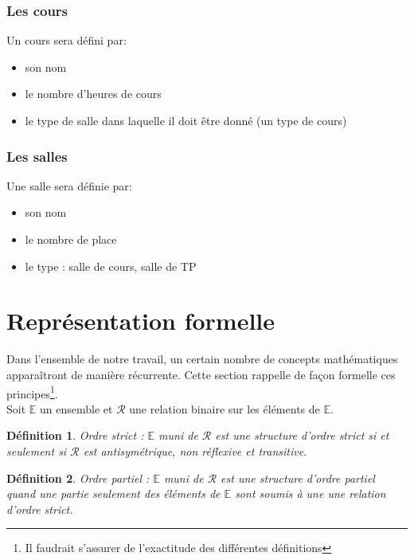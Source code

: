 \documentclass[12pt,a4paper,french]{article}
\begin{document}
\subsubsection{Les cours}
Un cours sera défini par:
\begin{itemize}
\item son nom
\item le nombre d'heures de cours
\item le type de salle dans laquelle il doit être donné (un type de cours)
\end{itemize}

\subsubsection{Les salles}
Une salle sera définie par:
\begin{itemize}
\item son nom
\item le nombre de place
\item le type : salle de cours, salle de TP
\end{itemize}

\newpage
\section{Représentation formelle}

\newtheorem{definition}{Définition}
\newtheorem{lemme}{Lemme}
\newtheorem{proposition}{Proposition}
\newtheorem{theoreme}{Thorme}
\newtheorem{eg}{Exemple}
\newcommand{\ds}{\displaystyle}



Dans l'ensemble de notre travail, un certain nombre de concepts mathématiques apparaîtront de manière récurrente. Cette section rappelle de façon formelle ces principes\footnote{Il faudrait s'assurer de l'exactitude des différentes définitions}.\\

Soit $\mathbb{E}$ un ensemble et  $\mathcal{R}$ une relation binaire sur les éléments de $\mathbb{E}$. 

\begin{definition}{\emph{Ordre strict : }}
$\mathbb{E}$ muni de $\mathcal{R}$ est une structure d'ordre strict si et seulement si $\mathcal{R}$ est antisymétrique, non réflexive et transitive.\\
\end{definition}

\begin{definition}{\emph{Ordre partiel :} }
$\mathbb{E}$ muni de $\mathcal{R}$ est une structure d'ordre partiel quand une partie seulement des éléments de $\mathbb{E}$ sont soumis à une une relation d'ordre strict.\\
\end{definition}
\end{document}
